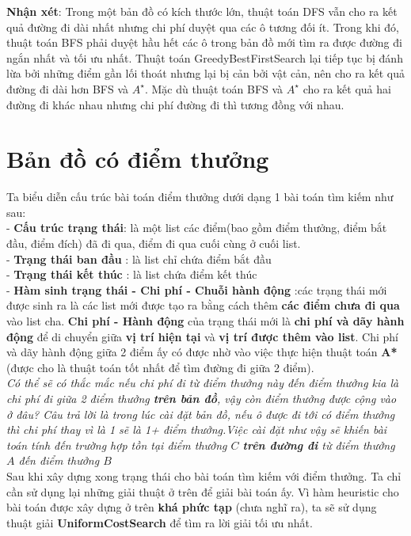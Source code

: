 \documentclass[11pt]{article} %
\begin{document}
\begin{itemize}
\begin{figure}[h]
\begin{tabular}{cc}
		\end{tabular}
	\end{figure}
	
	\textbf{Nhận xét}: Trong một bản đồ có kích thước lớn, thuật toán DFS vẫn cho ra kết quả đường đi dài nhất nhưng chi phí duyệt qua các ô tương đối ít. Trong khi đó, thuật toán BFS phải duyệt hầu hết các ô trong bản đồ mới tìm ra được đường đi ngắn nhất và tối ưu nhất. Thuật toán GreedyBestFirstSearch lại tiếp tục bị đánh lừa bởi những điểm gần lối thoát nhưng lại bị cản bởi vật cản, nên cho ra kết quả đường đi dài hơn BFS và $A^{\star}$. Mặc dù thuật toán BFS và $A^{\star}$ cho ra kết quả hai đường đi khác nhau nhưng chi phí đường đi thì tương đồng với nhau.
	
	\end{itemize}

\newpage
\section{Bản đồ có điểm thưởng}
Ta biểu diễn cấu trúc bài toán điểm thưởng dưới dạng 1 bài toán tìm kiếm như sau:\\
- \textbf{Cấu trúc trạng thái}: là một list các điểm(bao gồm điểm thưởng, điểm bắt đầu, điểm đích) đã đi qua, điểm đi qua cuối cùng ở cuối list. \\
- \textbf{Trạng thái ban đầu} : là  list chỉ chứa điểm bắt đầu\\
- \textbf{Trạng thái kết thúc} : là list chứa điểm kết thúc\\
- \textbf{Hàm sinh trạng thái - Chi phí - Chuỗi hành động} :các trạng thái mới được sinh ra là các list mới được tạo ra bằng cách thêm \textbf{các điểm chưa đi qua} vào list cha. \textbf{Chi phí - Hành động} của trạng thái mới là \textbf{chi phí và dãy hành động} để di chuyển giữa \textbf{vị trí hiện tại} và \textbf{vị trí được thêm vào list}. Chi phí và dãy hành động giữa 2 điểm ấy có được nhờ vào việc thực hiện thuật toán \textbf{A*} (được cho là thuật toán tốt nhất để tìm đường đi giữa 2 điểm).\\
\emph{Có thể sẽ có thắc mắc nếu chi phí đi từ điểm thưởng này đến điểm thưởng kia là chi phí đi giữa 2 điểm thưởng \textbf{trên bản đồ}, vậy còn điểm thưởng được cộng vào ở đâu? Câu trả lời là trong lúc cài đặt bản đồ, nếu ô được đi tới có điểm thưởng thì chi phí thay vì là 1 sẽ là 1+ điểm thưởng.Việc cài đặt như vậy sẽ khiến bài toán tính đến trường hợp tồn tại điểm thưởng $C$ \textbf{trên đường đi} từ điểm thưởng $A$ đến điểm thưởng $B$}\\
Sau khi xây dựng xong trạng thái cho bài toán tìm kiếm với điểm thưởng. Ta chỉ cần sử dụng lại những giải thuật ở trên để giải bài toán ấy. Vì hàm heuristic cho bài toán được xây dựng ở trên \textbf{khá phức tạp} (chưa nghĩ ra), ta sẽ sử dụng thuật giải \textbf{UniformCostSearch} để tìm ra lời giải tối ưu nhất.\\
\end{document}
